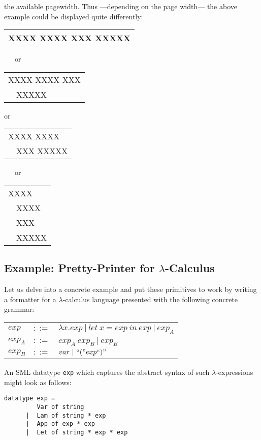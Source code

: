 \begin{itemize}
     the available pagewidth.
     Thus ---depending on the page width--- the above example could be
     displayed quite differently:
    \begin{center}
      \begin{tabular}{|l|}
       \hline
        XXXX XXXX XXX XXXXX\\ 
       \hline
      \end{tabular}
      ~~~or~~~
      \begin{tabular}{|l|}
       \hline
        XXXX XXXX XXX\\
        ~~XXXXX\\
       \hline
      \end{tabular}
    \end{center}
    \begin{center}
      or~~~
      \begin{tabular}{|l|}
       \hline
        XXXX XXXX\\
        ~~XXX XXXXX\\
       \hline
      \end{tabular}
      ~~~or~~~
      \begin{tabular}{|l|}
       \hline
        XXXX \\
        ~~XXXX\\
        ~~XXX\\
        ~~XXXXX\\ 
       \hline
      \end{tabular}
    \end{center}
  \end{itemize}
  
\subsection{Example: Pretty-Printer for $\lambda$-Calculus}
Let us delve into a concrete example and put these primitives to work by
writing a formatter for a $\lambda$-calculus language
presented with the following concrete grammar:
\begin{center}
\begin{tabular}{lcl}
$exp$ & $::=$ & $\lambda x. exp ~|~ let ~x = exp ~in~ exp ~|~ exp_A$ \\
$exp_A$ & $::=$ & $exp_A~exp_B ~|~ exp_B  $ \\
$exp_B$ & $::=$ & $var ~|~ {\mbox{\rm ``(''}} exp {\mbox{\rm ``)''}}$ \\
\end{tabular}
\end{center}
An SML datatype {\tt exp} which captures the abstract syntax 
of such $\lambda$-expressions might look as follows:
\begin{verbatim}
datatype exp =
         Var of string
      |  Lam of string * exp
      |  App of exp * exp
      |  Let of string * exp * exp
\end{verbatim}

